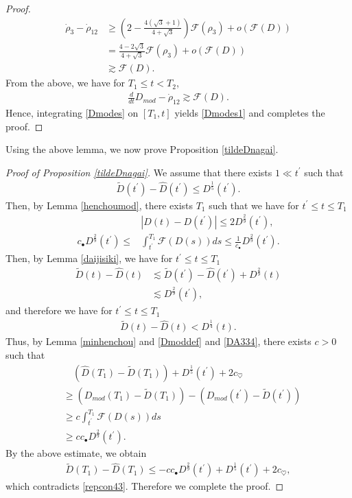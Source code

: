 \documentclass[reqno]{amsart}
\theoremstyle{plain}
\theoremstyle{definition}
\numberwithin{equation}{section}
\newcommand{\1}{\mathbbm{1}}
\begin{document}
\begin{proof}
\begin{align*}
\dot{\rho}_3-\dot{\rho}_{12}&\geq \left(2-\frac{4(\sqrt{3}+1)}{4+\sqrt{3}}\right)\mathcal{F}(\rho_3)+o\left(\mathcal{F}(D)\right)
\\
&=\frac{4-2\sqrt{3}}{4+\sqrt{3}}\mathcal{F}(\rho_3)+o\left(\mathcal{F}(D)\right)
\\
&\gtrsim \mathcal{F}(D).
\end{align*}
From the above, we have for $T_1\leq t<T_2$,
\begin{align}\label{Dmodes}
\frac{d}{dt}D_{mod}-\dot{\rho}_{12}\gtrsim \mathcal{F}(D).
\end{align}
Hence, integrating \eqref{Dmodes} on $[T_1,t]$ yields \eqref{Dmodes1} and completes the proof.
\end{proof}

Using the above lemma, we now prove Proposition \ref{tildeDnagai}.

\begin{proof}[Proof of Proposition \ref{tildeDnagai}]
We assume that there exists $1\ll t^{\prime}$ such that 
\begin{align}\label{DA334}
\tilde{D}(t^{\prime})-\hat{D}(t^{\prime})\leq D^{\frac{1}{5}}(t^{\prime}).
\end{align} 
Then, by Lemma \ref{henchoumod}, there exists $T_1$ such that we have for $t^{\prime}\leq t\leq T_1$
\begin{align*}
&\left|D(t)-D(t^{\prime})\right|\leq 2D^{\frac{2}{9}}(t^{\prime}),
\\
c_{\bullet}D^{\frac{2}{9}}(t^{\prime})\leq &\int_{t^{\prime}}^{T_1}\mathcal{F}(D(s))ds\leq \frac{1}{c_{\bullet}}D^{\frac{2}{9}}(t^{\prime}).
\end{align*}
Then, by Lemma \ref{daijisiki}, we have for $t^{\prime}\leq t\leq T_1$
\begin{align*}
\tilde{D}(t)-\hat{D}(t)&\lesssim \tilde{D}(t^{\prime})-\hat{D}(t^{\prime})+D^{\frac{2}{9}}(t)
\\
&\lesssim D^{\frac{2}{9}}(t^{\prime}),
\end{align*}
and therefore we have for $t^{\prime}\leq t\leq T_1$
\begin{align*}
\tilde{D}(t)-\hat{D}(t)<D^{\frac{1}{4}}(t).
\end{align*}
Thus, by Lemma \ref{minhenchou} and \eqref{Dmoddef} and \eqref{DA334}, there exists $c>0$ such that 
\begin{align*}
&\quad \left(\hat{D}(T_1)-\tilde{D}(T_1)\right)+D^{\frac{1}{5}}(t^{\prime})+2c_{\heartsuit}
\\
&\geq \left(D_{mod}(T_1)-\tilde{D}(T_1)\right)-\left(D_{mod}(t^{\prime})-\tilde{D}(t^{\prime})\right)
\\
&\geq c\int_{t^{\prime}}^{T_1}\mathcal{F}(D(s))ds
\\
&\geq cc_{\bullet}D^{\frac{2}{9}}(t^{\prime}).
\end{align*}
By the above estimate, we obtain
\begin{align*}
\tilde{D}(T_1)-\hat{D}(T_1)\leq -cc_{\bullet}D^{\frac{2}{9}}(t^{\prime})+D^{\frac{1}{5}}(t^{\prime})+2c_{\heartsuit},
\end{align*}
which contradicts \eqref{repcon43}. Therefore we complete the proof.
\end{proof}
\end{document}
